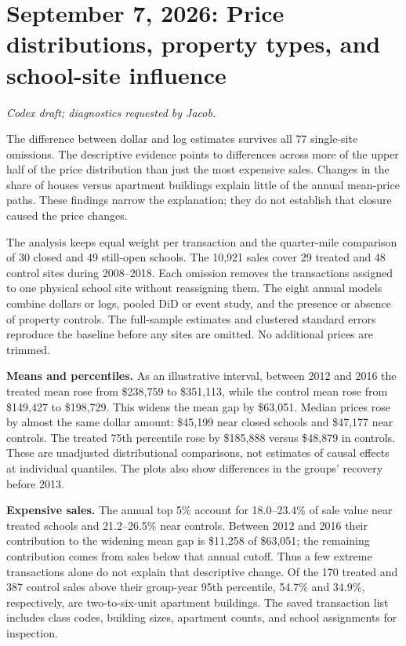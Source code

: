 \section*{September 7, 2026: Price distributions, property types, and school-site influence}
\textit{Codex draft; diagnostics requested by Jacob.}

The difference between dollar and log estimates survives all 77 single-site
omissions. The descriptive evidence points to differences across more of the
upper half of the price distribution than just the most expensive sales.
Changes in the share of houses versus apartment buildings explain little of
the annual mean-price paths. These findings narrow the explanation; they do
not establish that closure caused the price changes.

The analysis keeps equal weight per transaction and the quarter-mile comparison
of 30 closed and 49 still-open schools. The 10,921 sales cover 29 treated and
48 control sites during 2008--2018. Each omission removes the transactions
assigned to one physical school site without reassigning them. The eight
annual models combine dollars or logs, pooled DiD or event study, and the
presence or absence of property controls. The full-sample estimates and
clustered standard errors reproduce the baseline before any sites are omitted.
No additional prices are trimmed.

\textbf{Means and percentiles.} As an illustrative interval, between 2012 and
2016 the treated mean rose from \$238,759 to \$351,113, while the control mean
rose from \$149,427 to \$198,729. This widens the mean gap by \$63,051.
Median prices rose by almost the same dollar amount: \$45,199 near closed
schools and \$47,177 near controls. The treated 75th percentile rose by
\$185,888 versus \$48,879 in controls. These are unadjusted distributional
comparisons, not estimates of causal effects at individual quantiles.
The plots also show differences in the groups' recovery before 2013.

\textbf{Expensive sales.} The annual top 5\% account for 18.0--23.4\% of
sale value near treated schools and 21.2--26.5\% near controls. Between 2012
and 2016 their contribution to the widening mean gap is \$11,258 of
\$63,051; the remaining contribution comes from sales below that annual
cutoff. Thus a few extreme transactions alone do not explain that descriptive
change. Of the 170 treated and 387 control sales above their group-year
95th percentile, 54.7\% and 34.9\%, respectively, are two-to-six-unit
apartment buildings. The saved transaction list includes class codes,
building sizes, apartment counts, and school assignments for inspection.

